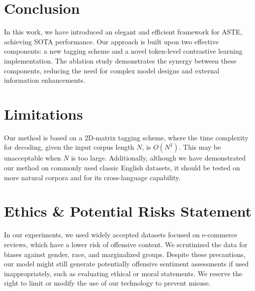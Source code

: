 \documentclass[11pt]{article}
\begin{document}



\section{Conclusion}
In this work, we have introduced an elegant and efficient framework for ASTE, achieving SOTA performance. Our approach is built upon two effective components: a new tagging scheme and a novel token-level contrastive learning implementation. The ablation study demonstrates the synergy between these components, reducing the need for complex model designs and external information enhancements. 

\section{Limitations}
Our method is based on a 2D-matrix tagging scheme, where the time complexity for decoding, given the input corpus length \(N\), is \(O(N^2)\). This may be unacceptable when \(N\) is too large. 
Additionally, although we have demonstrated our method on commonly used classic English datasets, it should be tested on more natural corpora and for its cross-language capability.

\section{Ethics \& Potential Risks Statement}
In our experiments, we used widely accepted datasets focused on e-commerce reviews, which have a lower risk of offensive content. We scrutinized the data for biases against gender, race, and marginalized groups. Despite these precautions, our model might still generate potentially offensive sentiment assessments if used inappropriately, such as evaluating ethical or moral statements. We reserve the right to limit or modify the use of our technology to prevent misuse.

\end{document}
